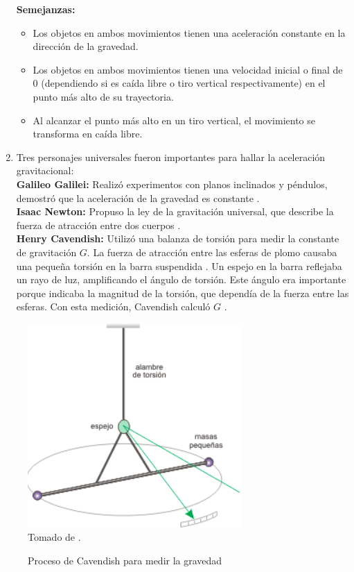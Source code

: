 \begin{multicols}{2}
\begin{enumerate}
    \textbf{Semejanzas:}
    \begin{itemize}
        \item Los objetos en ambos movimientos tienen una aceleración constante en la dirección de la gravedad.
        \item Los objetos en ambos movimientos tienen una velocidad inicial o final de 0 (dependiendo si es caída libre o tiro vertical respectivamente) en el punto más alto de su trayectoria.
        \item Al alcanzar el punto más alto en un tiro vertical, el movimiento se transforma en caída libre.
    \end{itemize}
\item Tres personajes universales fueron importantes para hallar la aceleración gravitacional: \vspace{0.5cm} \\
    \textbf{Galileo Galilei:} Realizó experimentos con planos inclinados y péndulos, demostró que la aceleración de la gravedad es constante \parencite{serway2005fisica}.\\
    \textbf{Isaac Newton:} Propuso la ley de la gravitación universal, que describe la fuerza de atracción entre dos cuerpos \parencite{serway2005fisica}.\\
    \textbf{Henry Cavendish:} Utilizó una balanza de torsión para medir la constante de gravitación $G$. 
    La fuerza de atracción entre las esferas de plomo causaba una pequeña torsión en la barra suspendida \parencite{rsef2010}. 
    Un espejo en la barra reflejaba un rayo de luz, amplificando el ángulo de torsión. 
    Este ángulo era importante porque indicaba la magnitud de la torsión, que dependía de la fuerza entre las esferas. 
    Con esta medición, Cavendish calculó $G$ \parencite{fernando2017}.
\end{enumerate}

\begin{figure}[H]
    \caption{Proceso de Cavendish para medir la gravedad}
    \centering
    \includegraphics[scale=0.7]{fig/procesoCavendish-gravedad.png}
    \label{fig:procesoCavendish}
    \\Tomado de \parencite{ricuti2024}.
\end{figure}


\end{multicols}
